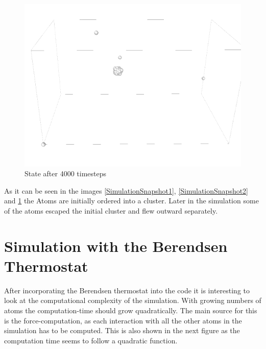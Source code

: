 \begin{figure}
	\begin{center}
		\includegraphics[scale= 0.65]{Figure/3ImageS.png}
	\end{center}
	\caption[Simulation Snapshot 3]{State after 4000 timesteps}
	\label{SimulationSnapshot3}
\end{figure}
As it can be seen in the images \ref{SimulationSnapshot1}, \ref{SimulationSnapshot2} and \ref{SimulationSnapshot3} the Atoms are initially ordered into a cluster.
Later in the simulation some of the atoms escaped the initial cluster and flew outward separately. 
\section{Simulation with the Berendsen Thermostat}

After incorporating the Berendsen thermostat into the code it is interesting to look at the computational complexity of the simulation. 
With growing numbers of atoms the computation-time should grow quadratically. 
The main source for this is the force-computation, as each interaction with all the other atoms in the simulation has to be computed. This is also shown in the next figure as the computation time seems to follow a quadratic function. 

